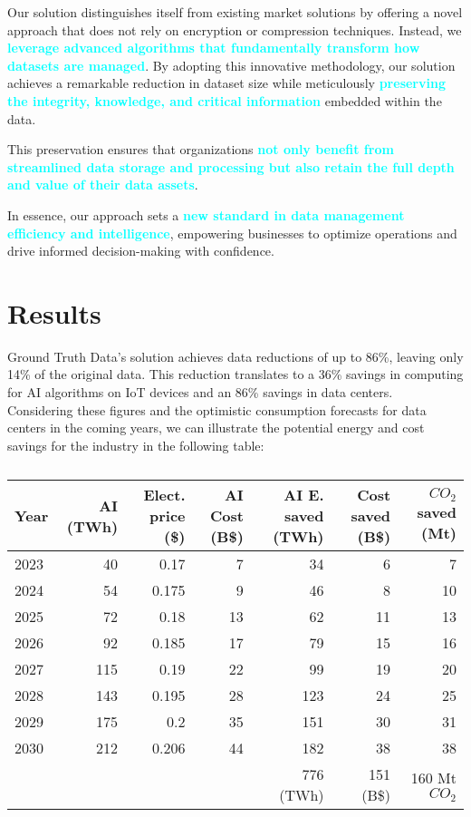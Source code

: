 Our solution distinguishes itself from existing market solutions by offering a novel approach that does not rely on encryption or compression techniques. Instead, we \textbf{\textcolor{cyan}{leverage advanced algorithms that fundamentally transform how datasets are managed}}. By adopting this innovative methodology, our solution achieves a remarkable reduction in dataset size while meticulously \textbf{\textcolor{cyan}{preserving the integrity, knowledge, and critical information}} embedded within the data. 

This preservation ensures that organizations \textbf{\textcolor{cyan}{not only benefit from streamlined data storage and processing but also retain the full depth and value of their data assets}}. 

In essence, our approach sets a \textbf{\textcolor{cyan}{new standard in data management efficiency and intelligence}}, empowering businesses to optimize operations and drive informed decision-making with confidence.

\section{Results}

Ground Truth Data's solution achieves data reductions of up to 86\%, leaving only 14\% of the original data. This reduction translates to a 36\% savings in computing for AI algorithms on IoT devices and an 86\% savings in data centers.\\


Considering these figures and the optimistic consumption forecasts for data centers in the coming years, we can illustrate the potential energy and cost savings for the industry in the following table:

\begin{table}[H]
    \centering
    \footnotesize
    \begin{tabular}{lrrrrrr}
        \toprule
        Year & AI (TWh) & Elect. price (\$) & AI Cost (B\$) & AI E. saved (TWh) & Cost saved (B\$)  & $CO_2$ saved (Mt)  \\
        \midrule
        2023 & 40  & 0.17  & 7  & 34  & 6  & 7  \\
        2024 & 54  & 0.175 & 9  & 46  & 8  & 10 \\
        2025 & 72  & 0.18  & 13 & 62  & 11 & 13 \\
        2026 & 92  & 0.185 & 17 & 79  & 15 & 16 \\
        2027 & 115 & 0.19  & 22 & 99  & 19 & 20 \\
        2028 & 143 & 0.195 & 28 & 123 & 24 & 25 \\
        2029 & 175 & 0.2   & 35 & 151 & 30 & 31 \\
        2030 & 212 & 0.206 & 44 & 182 & 38 & 38 \\
        \midrule
        & & & & 776 (TWh) & 151 (B\$) & 160 Mt $CO_2$ \\
        \bottomrule
    \end{tabular}
    \caption{}
    \label{tab:ai_summary}
\end{table}
